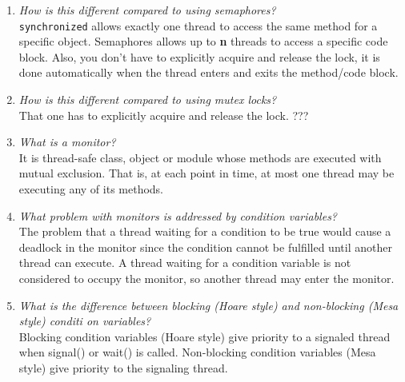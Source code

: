 \documentclass[a4paper]{article}
\begin{document}
\begin{enumerate}
  \item \textit{ How is this different compared to using semaphores? }\\

    \texttt{synchronized} allows exactly one thread to access the same method for a specific object. Semaphores allows up to \textbf{n} threads to access a specific code block. Also, you don't have to explicitly acquire and release the lock, it is done automatically when the thread enters and exits the method/code block.

  \item \textit{ How is this different compared to using mutex locks? }\\

    That one has to explicitly acquire and release the lock. {\color{red}???}

  \item \textit{ What is a monitor? }\\

    It is thread-safe class, object or module whose methods are executed with mutual exclusion. That is, at each point in time, at most one thread may be executing any of its methods.

  \item \textit{ What problem with monitors is addressed by condition variables? }\\

    The problem that a thread waiting for a condition to be true would cause a deadlock in the monitor since the condition cannot be fulfilled until another thread can execute. A thread waiting for a condition variable is not considered to occupy the monitor, so another thread may enter the monitor.

  \item \textit{ What is the difference between blocking (Hoare style) and non-blocking (Mesa style) conditi
on variables? }\\

    Blocking condition variables (Hoare style) give priority to a signaled thread when signal() or wait() is called. Non-blocking condition variables (Mesa style) give priority to the signaling thread.

\end{enumerate}
\end{document}
